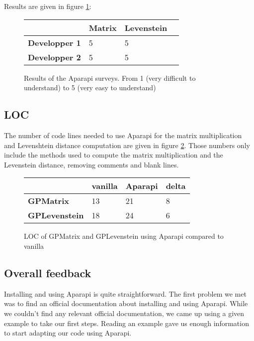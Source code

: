 Results are given in figure \ref{table aparapi code feedback}:

\begin{figure}[H]
\begin{center}
\begin{tabular}{ |l|l|l|l| } 
 \hline
  & \textbf{Matrix} & \textbf{Levenstein} \\
 \hline
 \textbf{Developper 1} & 5 & 5 \\ 
 \hline
 \textbf{Developper 2} & 5 & 5 \\ 
 \hline
\end{tabular}
\end{center}
\caption{Results of the Aparapi surveys. From 1 (very difficult to understand) to 5 (very easy to understand)}
\label{table aparapi code feedback}
\end{figure}

\subsection{LOC}

The number of code lines needed to use Aparapi for the matrix multiplication and Levenshtein distance computation are given in figure \ref{table aparapi loc}. Those numbers only include the methods used to compute the matrix multiplication and the Levenstein distance, removing comments and blank lines.

\begin{figure}[H]
\begin{center}
\begin{tabular}{ |l|l|l|l| } 
 \hline
 & \textbf{vanilla} & \textbf{Aparapi} & \textbf{delta} \\
 \hline
 \textbf{GPMatrix} & 13 & 21 & 8 \\ 
 \hline
 \textbf{GPLevenstein} & 18 & 24 & 6 \\ 
 \hline
\end{tabular}
\end{center}
\caption{LOC of GPMatrix and GPLevenstein using Aparapi compared to vanilla}
\label{table aparapi loc}
\end{figure}

\subsection{Overall feedback}

Installing and using Aparapi is quite straightforward. The first problem we met was to find an official documentation about installing and using Aparapi. While we couldn't find any relevant official documentation, we came up using a given example to take our first steps. Reading an example gave us enough information to start adapting our code using Aparapi.

